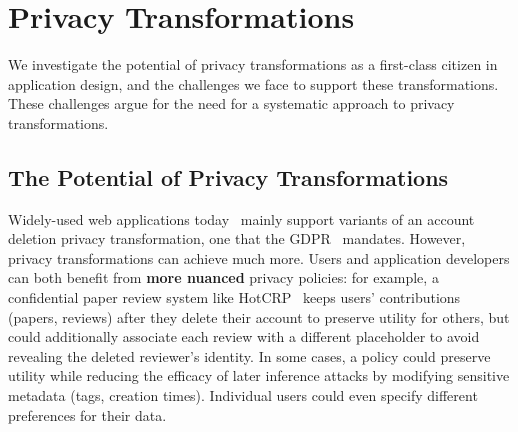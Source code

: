 \section{Privacy Transformations}
\label{sec:survey}

We investigate the potential of privacy transformations as a first-class citizen in application
design, and the challenges we face to support these transformations. These challenges argue for the
need for a systematic approach to privacy transformations.

\subsection{The Potential of Privacy Transformations}
Widely-used web applications today~\cite{spotify:privacy, amazon:privacy,
strava:privacy, hotcrp:privacy, wikipedia:privacy, facebook:privacy, twitter:privacy,
reddit:privacy, github:privacy, lobsters:privacy} mainly support variants of an account deletion privacy transformation,
one that \eg the GDPR~\cite[Art.\ 17]{eu:gdpr} mandates.
However, privacy transformations can achieve much more.
%
Users and application developers can both benefit from \textbf{more nuanced} privacy policies:
%
for example, a confidential paper review system like HotCRP~\cite{hotcrp} keeps users'
contributions (papers, reviews) after they delete their account to preserve utility for others, but
could additionally associate each review with a different placeholder to avoid revealing the deleted
reviewer's identity.
%
In some cases, a policy could preserve utility while reducing the efficacy of later inference
attacks by \eg modifying sensitive metadata (\eg tags, creation times).
%
%
%
Individual users could even specify different preferences for their data.
%
%


